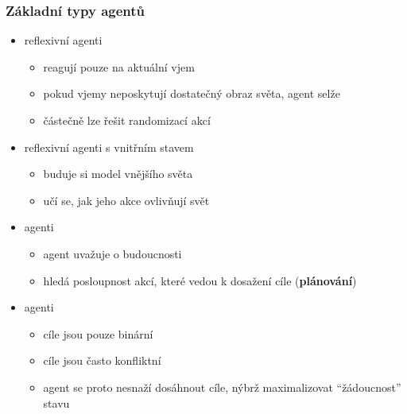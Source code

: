 \documentclass[red,professionalfont]{beamer}
\theoremstyle{definition}
\newcommand{\0}{\mbox{${\bf 0}$}}
\begin{document}
\begin{frame}\frametitle{Základní typy agentů}
 \begin{itemize}
  \item reflexivní agenti\pause
  \begin{itemize}
   \item reagují pouze na aktuální vjem\pause
   \item pokud vjemy neposkytují dostatečný obraz světa,
         agent selže\pause
   \item částečně lze řešit randomizací akcí\pause
  \end{itemize}
  \item reflexivní agenti s vnitřním stavem\pause
  \begin{itemize}
   \item buduje si model vnějšího světa\pause
   \item učí se, jak jeho akce ovlivňují svět\pause
  \end{itemize}
  \item {} agenti\pause
  \begin{itemize}
  \item agent uvažuje o budoucnosti\pause
  \item hledá posloupnost akcí, které vedou k dosažení cíle ({\bf plánování})\pause
  \end{itemize}
  \item {} agenti\pause
  \begin{itemize}
   \item cíle jsou pouze binární\pause
   \item cíle jsou často konfliktní\pause
   \item agent se proto nesnaží dosáhnout cíle, nýbrž maximalizovat
         ``žádoucnost'' stavu
  \end{itemize}
 \end{itemize}
\end{frame}
\end{document}

